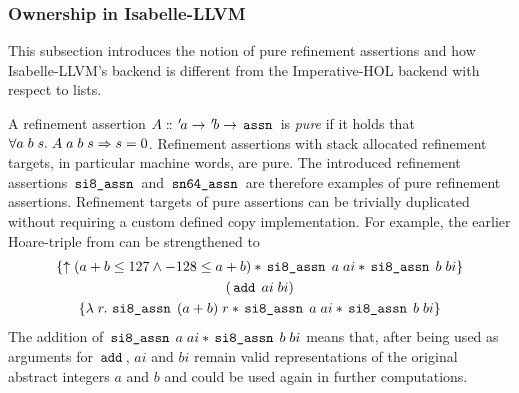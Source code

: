 \subsubsection{Ownership in Isabelle-LLVM}\label{sec:ownership-in-isabelle-llvm}
This subsection introduces the notion of pure refinement assertions and how Isabelle-LLVM's backend is different from the Imperative-HOL backend with respect to lists.

A refinement assertion $A \mathrel{\mathord{:}\mkern-1.2mu\mathord{:}} {\mskip2mu '\mskip-2mua} \rightarrow {\mskip2mu '\mskip-2mub} \rightarrow \,\text{\ttfamily assn}\,$ is \textit{pure} if it holds that $\forall a \; b \; s. \; A \; a \; b \; s \Rightarrow s = 0$.
Refinement assertions with stack allocated refinement targets, in particular machine words, are pure.
The introduced refinement assertions $\,\text{\ttfamily si8\_assn}\,$ and $\,\text{\ttfamily sn64\_assn}\,$ are therefore examples of pure refinement assertions.
Refinement targets of pure assertions can be trivially duplicated without requiring a custom defined copy implementation.
For example, the earlier Hoare-triple from  can be strengthened to
\begin{gather*}
	\{\uparrow(a + b \le 127 \land -128 \le a + b) \ast \,\text{\ttfamily si8\_assn}\, \; a \; ai \ast \,\text{\ttfamily si8\_assn}\, \; b \; bi\} \\
	(\,\text{\ttfamily add}\, \; ai \; bi) \\
	\{\lambda \; r.\, \,\text{\ttfamily si8\_assn}\, \; (a + b) \; r \ast \,\text{\ttfamily si8\_assn}\, \; a \; ai \ast \,\text{\ttfamily si8\_assn}\, \; b \; bi\}
\end{gather*}
The addition of $\,\text{\ttfamily si8\_assn}\, \; a \; ai \ast \,\text{\ttfamily si8\_assn}\, \; b \; bi$ means that, after being used as arguments for $\,\text{\ttfamily add}\,$, $ai$ and $bi$ remain valid representations of the original abstract integers $a$ and $b$ and could be used again in further computations.

